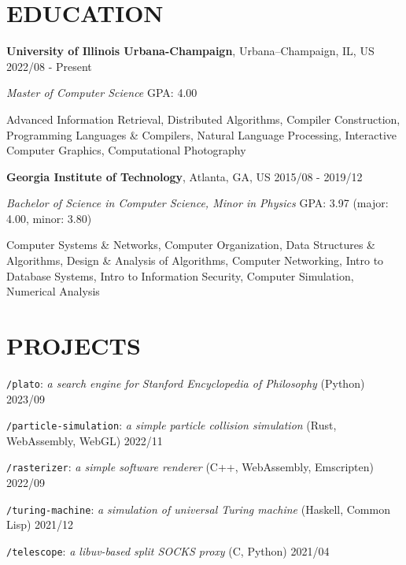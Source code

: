 \documentclass[10pt]{article}
\begin{document}
\section*{EDUCATION}
\textbf{University of Illinois Urbana-Champaign}, Urbana–Champaign, IL, US  \hfill 2022/08 - Present

\textit{Master of Computer Science}  \hfill GPA: 4.00

\vspace{0.5em}
Advanced Information Retrieval, Distributed Algorithms, Compiler Construction, Programming Languages \& Compilers, Natural Language Processing, Interactive Computer Graphics, Computational Photography

\vspace{1em}
\textbf{Georgia Institute of Technology}, Atlanta, GA, US \hfill 2015/08 - 2019/12

\textit{Bachelor of Science in Computer Science, Minor in Physics} \hfill GPA: 3.97 (major: 4.00, minor: 3.80)

\vspace{0.5em}
Computer Systems \& Networks, Computer Organization, Data Structures \& Algorithms, Design \& Analysis of Algorithms, Computer Networking, Intro to Database Systems, Intro to Information Security, Computer Simulation, Numerical Analysis


\section*{PROJECTS}

\vspace{0.5em}
\texttt{/plato}: \textit{a search engine for Stanford Encyclopedia of Philosophy} \hfill (Python) 2023/09

\vspace{0.5em}
\texttt{/particle-simulation}: \textit{a simple particle collision simulation} \hfill (Rust, WebAssembly, WebGL)  2022/11

\vspace{0.5em}
\texttt{/rasterizer}: \textit{a simple software renderer} \hfill (C++, WebAssembly, Emscripten) 2022/09

\vspace{0.5em}
\texttt{/turing-machine}: \textit{a simulation of universal Turing machine} \hfill (Haskell, Common Lisp) 2021/12

\vspace{0.5em}
\texttt{/telescope}: \textit{a libuv-based split SOCKS proxy} \hfill (C, Python)  2021/04
\end{document}
